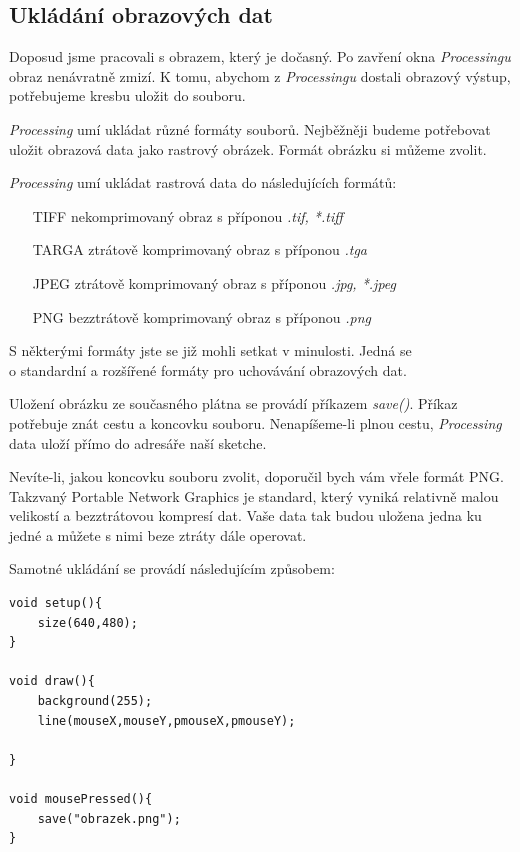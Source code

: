 \documentclass[10pt,twoside=true,open=right,cleardoublepage=empty,chapterprefix=true]{scrbook}
\newcommand{\pododdil}[1]{\subsection{#1}\index{#1}\label{#1}}
\newcommand{\vyraz}[1]{\textit{\gls{#1}}\index{#1}\label{#1}}
\begin{document}
\pododdil{Ukládání obrazových dat}

Doposud jsme pracovali s obrazem, který je dočasný. Po zavření okna {\em Processingu} obraz nenávratně zmizí. K tomu, abychom z {\em Processingu} dostali obrazový výstup, potřebujeme kresbu uložit do souboru.

{\em Processing} umí ukládat různé formáty souborů. Nejběžněji budeme potřebovat uložit obrazová data jako rastrový obrázek. Formát obrázku si můžeme zvolit.

{\em Processing} umí ukládat rastrová data do následujících formátů:


\begin{itemize}
\item[TIFF]
nekomprimovaný obraz s příponou {\em *.tif, *.tiff}
\item[TARGA]
ztrátově komprimovaný obraz s příponou {\em *.tga}
\item[JPEG]
ztrátově komprimovaný obraz s příponou {\em *.jpg, *.jpeg}
\item[PNG]
bezztrátově komprimovaný obraz s příponou {\em *.png}

\end{itemize}

S některými formáty jste se již mohli setkat v minulosti. Jedná se \\o standardní a rozšířené formáty pro uchovávání obrazových dat.

Uložení obrázku ze současného plátna se provádí příkazem \vyraz{save()}. Příkaz potřebuje znát cestu a koncovku souboru. Nenapíšeme-li plnou cestu, {\em Processing} data uloží přímo do adresáře naší sketche.

Nevíte-li, jakou koncovku souboru zvolit, doporučil bych vám vřele formát PNG. Takzvaný Portable Network Graphics je standard, který vyniká relativně malou velikostí a bezztrátovou kompresí dat. Vaše data tak budou uložena jedna ku jedné a můžete s nimi beze ztráty dále operovat. 

Samotné ukládání se provádí následujícím způsobem:

\begin{lstlisting} 
void setup(){
	size(640,480);
}

void draw(){
	background(255);
	line(mouseX,mouseY,pmouseX,pmouseY);

}

void mousePressed(){
	save("obrazek.png");
}

\end{lstlisting}
\end{document}
